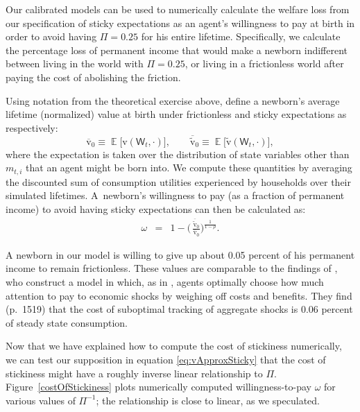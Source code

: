 \documentclass[titlepage]{article}
\DeclareMathOperator{\Ex}{\mathbb{E}} %
\begin{document}
Our calibrated models can be used to numerically calculate the welfare loss from our specification of sticky expectations as an agent's willingness to pay at birth in order to avoid having $\Pi=0.25$ for his entire lifetime. Specifically, we calculate the percentage loss of permanent income that would make a newborn indifferent between living in the world with $\Pi=0.25$, or living in a frictionless world after paying the cost of abolishing the friction.  

Using notation from the theoretical exercise above, define a newborn's average lifetime (normalized) value at birth under frictionless and sticky expectations as respectively:
\begin{equation*}
\overline{\mathrm{v}}_0 \equiv \Ex \big[ \mathrm{v}(\mathsf{W}_t,\cdot)\big], \qquad \overline{\widetilde{\mathrm{v}}}_0 \equiv \Ex \big[ \widetilde{\mathrm{v}}(\mathsf{W}_t,\cdot)\big],
\end{equation*}
where the expectation is taken over the distribution of state variables other than $m_{t,i}$ that an agent might be born into.  We compute these quantities by averaging the discounted sum of consumption utilities experienced by households over their simulated lifetimes.  A~newborn's willingness to pay (as a fraction of permanent income) to avoid having sticky expectations can then be calculated as:
\begin{eqnarray}\label{eq:WTP}
\omega & = & 1 - \bigg(\,\frac{\overline{\widetilde{\mathrm{v}}}_0}{\overline{\mathrm{v}}_0} \bigg)^{\frac{1}{1-\rho}}.
\end{eqnarray}

A newborn in our model is willing to give up about 0.05 percent of his permanent income to remain frictionless.  These values are comparable to the findings of \cite{mackWiedREStud15}, who construct a model in which, as in \cite{reis:inattentive}, agents optimally choose how much attention to pay to economic shocks by weighing off costs and benefits.  They find (p.\ 1519) that the cost of suboptimal tracking of aggregate shocks is 0.06 percent of steady state consumption. 

Now that we have explained how to compute the cost of stickiness numerically, we can test our supposition in equation \eqref{eq:vApproxSticky} that the cost of stickiness might have a roughly inverse linear relationship to $\Pi$.  Figure~\ref{costOfStickiness} plots numerically computed willingness-to-pay $\omega$ for various values of $\Pi^{-1}$; the relationship is close to linear, as we speculated.
\end{document}
